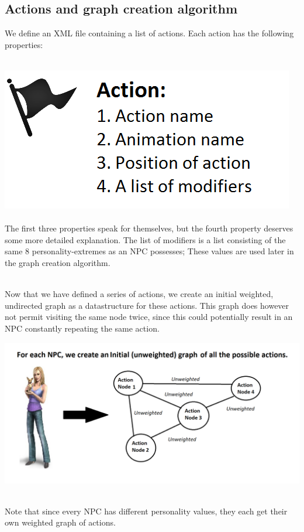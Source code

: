 \documentclass[11pt]{article} %
\begin{document}
\newpage
\subsection{Actions and graph creation algorithm}
We define an XML file containing a list of actions. Each action has the following properties:

~\\
\includegraphics[scale=0.7]{ActionFlag}
~\\

~\\
The first three properties speak for themselves, but the fourth property deserves some more detailed explanation. The list of modifiers is a list consisting of the same 8 personality-extremes as an NPC possesses; These values are used later in the graph creation algorithm.

~\\
Now that we have defined a series of actions, we create an initial weighted, undirected graph as a datastructure for these actions. This graph does however not permit visiting the same node twice, since this could potentially result in an NPC constantly repeating the same action. 

\includegraphics[scale=0.4]{InitialGraph}

~\\
Note that since every NPC has different personality values, they each get their own weighted graph of actions. 
\end{document}
